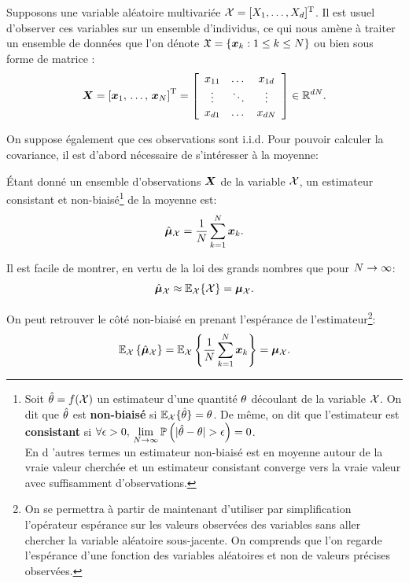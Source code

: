 Supposons une variable aléatoire multivariée $\mathcal{X}=[X_1,\dots,X_d]^{\mathrm{T}}$. Il est usuel d'observer ces variables sur un ensemble d'individus, ce qui nous amène à traiter un ensemble de données que l'on dénote $\mathfrak{X} = \{\boldsymbol{x}_k:1\leq k\leq N\}$ ou bien sous forme de matrice :
\begin{equation}
  \boldsymbol{X} = \left[\boldsymbol{x}_1,\, \dots,\, \boldsymbol{x}_N \right]^{\mathrm{T}} = \left[ \begin{array}{ccc} x_{11} & \dots & x_{1d} \\ \vdots & \ddots & \vdots \\ x_{d 1} & \dots & x_{d N}   \end{array}  \right]\in\mathbb{R}^{dN}.
  \label{eq:context-definition-observed_data}
\end{equation}

On suppose également que ces observations sont i.i.d. Pour pouvoir calculer la covariance, il est d'abord nécessaire de s'intéresser à la moyenne:
\begin{proposition}
  \'Etant donné un ensemble d'observations $\boldsymbol{X}$ de la variable $\mathcal{X}$, un estimateur consistant et non-biaisé\footnote{Soit $\hat{\theta}=f(\mathcal{X})$ un estimateur d'une quantité $\theta$ découlant de la variable $\mathcal{X}$. On dit que $\hat{\theta}$ est \textbf{non-biaisé} si $\operatorname{\mathbb{E}}_{\mathcal{X}}\{\hat{\theta}\} = \theta$. De même, on dit que l'estimateur est \textbf{consistant} si $\forall \epsilon>0,\, \displaystyle\lim_{\Nobs\to\infty} \Prob\left(|\hat{\param}-\param|>\epsilon\right)=0$.\\En d 'autres termes un estimateur non-biaisé est en moyenne autour de la vraie valeur cherchée et un estimateur consistant converge vers la vraie valeur avec suffisamment d'observations.} de la moyenne est:
  \begin{equation}
    \hat{\boldsymbol{\mu}}_{\mathcal{X}} = \frac{1}{N}\sum_{k=1}^{N} \boldsymbol{x}_k.
    \label{eq:context-estimation-moyenne}
  \end{equation}
\end{proposition}

\begin{remark}
  Il est facile de montrer, en vertu de la loi des grands nombres que pour $N\to\infty$:
  $$
  \hat{\boldsymbol{\mu}}_{\mathcal{X}} \approx \operatorname{\mathbb{E}}_{\mathcal{X}}\{\mathcal{X}\}=\boldsymbol{\mu}_{\mathcal{X}}.
  $$
\end{remark}


\begin{remark}
  On peut retrouver le côté non-biaisé en prenant l'espérance de l'estimateur\footnote{On se permettra à partir de maintenant d'utiliser par simplification l'opérateur espérance sur les valeurs observées des variables sans aller chercher la variable aléatoire sous-jacente. On comprends que l'on regarde l'espérance d'une fonction des variables aléatoires et non de valeurs précises observées.}:
  $$
  \operatorname{\mathbb{E}}_{\mathcal{X}}\left\{\hat{\boldsymbol{\mu}}_{\mathcal{X}}\right\} = \operatorname{\mathbb{E}}_{\mathcal{X}}\left\{\frac{1}{N}\sum_{k=1}^{N}\boldsymbol{x}_k\right\} = \boldsymbol{\mu}_{\mathcal{X}}.
  $$
\end{remark}


